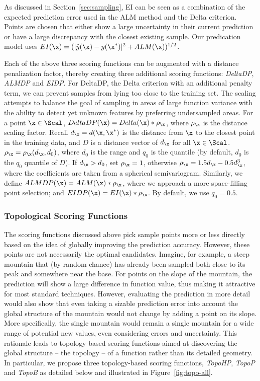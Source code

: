 %
As discussed in Section~\ref{sec:sampling}, EI can be seen as a combination of the expected prediction error used in the ALM method and the Delta criterion.
%
Points are chosen that either show a large uncertainty in their current prediction or have a large discrepancy with the closest existing sample.
%
Our predication model uses $EI(\x) = (|\hat{y}(\x) - y(\x^*)|^2+ ALM(\x))^{1/2}$.

 Each of the above three scoring functions can be augmented with a distance penalization factor, thereby creating three additional scoring functions: \emph{DeltaDP}, \emph{ALMDP} and \emph{EIDP}.
%
For DeltaDP, the Delta criterion with an additional penalty term, we can prevent samples from lying too close to the training set.
%
The scaling attempts to balance the goal of sampling in areas of large function variance with the ability to detect yet unknown features by preferring undersampled areas.
%
For a point $\x \in \Scal$, $DeltaDP(\x) = Delta(\x) * \rho_\x$, where $\rho_\x$ is the distance scaling factor.
%
Recall $d_\x = d(\x,\x^*)$ is the distance from $\x$ to the closest point in the training data, and $D$ is a distance vector of $d_\x$ for all $\x \in \Scal$.
%
$\rho_\x = \rho_\x (d_\x, d_0)$, where $d_0$ is the range and $q_0$ is the quantile (by default, $d_0$ is the $q_0$ quantile of $D$).
%
If $d_\x>d_0$, set $\rho_\x = 1$, otherwise $\rho_\x = 1.5d_\x-0.5d_\x^3$, where the coefficients are taken from a spherical semivariogram.
%
Similarly, we define $ALMDP(\x) = ALM(\x) * \rho_\x$, where we approach a more space-filling point selection; and $EIDP(\x) = EI(\x) * \rho_\x$.
%
By default, we use $q_0 = 0.5$.

\subsubsection{Topological Scoring Functions}
\label{sec:toposcoring}
The scoring functions discussed above pick sample points more or less directly based on the idea of globally improving the prediction accuracy.
%
However, these points are not necessarily the optimal candidates.
%
Imagine, for example, a steep mountain that (by random chance) has already been sampled both close to its peak and somewhere near the base.
%
For points on the slope of the mountain, the prediction will show a large difference in function value, thus making it attractive for most standard techniques.
%
However, evaluating the prediction in more detail would also show that even taking a sizable prediction error into account the global structure of the mountain would not change by adding a point on its slope.
%
More specifically, the single mountain would remain a single mountain for a wide range of potential new values, even considering errors and uncertainty.
%
This rationale leads to topology based scoring functions aimed at discovering the global structure -- the topology -- of a function rather than its detailed geometry.
%
In particular, we propose three topology-based scoring functions, \emph{TopoHP}, \emph{TopoP} and \emph{TopoB} as detailed below and illustrated in Figure~\ref{fig:topo-all}.


